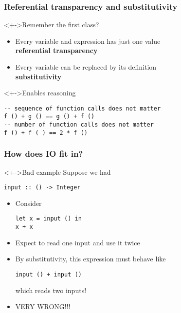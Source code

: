 \documentclass{beamer}
\subtitle{IO}
\begin{document}
\begin{frame}
  \titlepage
\end{frame}
\begin{frame}[fragile]
  \frametitle{Referential transparency and substitutivity}
  \begin{block}<+->{Remember the first class?}
    \begin{itemize}
    \item Every variable and expression has just one value\\
      \textbf{referential transparency}
    \item Every variable can be replaced by its definition\\
      \textbf{substitutivity}
    \end{itemize}
  \end{block}
  \begin{block}<+->{Enables reasoning}
\begin{lstlisting}
-- sequence of function calls does not matter
f () + g () == g () + f ()
-- number of function calls does not matter
f () + f ( ) == 2 * f ()
\end{lstlisting}
  \end{block}
\end{frame}
\begin{frame}[fragile]
  \frametitle{How does IO fit in?}
  \begin{alertblock}<+->{Bad example}
    Suppose we had 
\begin{lstlisting}
input :: () -> Integer
\end{lstlisting}
    \begin{itemize}
    \item<+-> Consider
\begin{lstlisting}
let x = input () in
x + x
\end{lstlisting}
    \item<+-> Expect to read one input and use it twice
    \item<+-> By substitutivity, this expression must behave like
\begin{lstlisting}
input () + input ()
\end{lstlisting}
      which reads two inputs!
    \item<+-> VERY WRONG!!!
  \end{itemize}
  \end{alertblock}
\end{frame}
\end{document}
